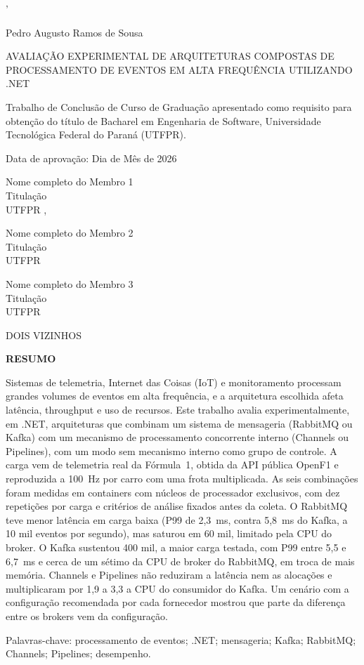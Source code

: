 '\documentclass[12pt]{article}
\newcommand{\autor}{Pedro Augusto Ramos de Sousa}
\newcommand{\titulo}{Avaliação Experimental de Arquiteturas Compostas de Processamento de Eventos em Alta Frequência Utilizando .NET}
\newcommand{\tituloUppercase}{\MakeUppercase{\titulo}}
\newcommand{\textoResumo}{Sistemas de telemetria, Internet das Coisas (IoT) e monitoramento processam grandes volumes de eventos em alta frequência, e a arquitetura escolhida afeta latência, throughput e uso de recursos. Este trabalho avalia experimentalmente, em .NET, arquiteturas que combinam um sistema de mensageria (RabbitMQ ou Kafka) com um mecanismo de processamento concorrente interno (Channels ou Pipelines), com um modo sem mecanismo interno como grupo de controle. A carga vem de telemetria real da Fórmula~1, obtida da API pública OpenF1 e reproduzida a 100~Hz por carro com uma frota multiplicada. As seis combinações foram medidas em containers com núcleos de processador exclusivos, com dez repetições por carga e critérios de análise fixados antes da coleta. O RabbitMQ teve menor latência em carga baixa (P99 de 2,3~ms, contra 5,8~ms do Kafka, a 10 mil eventos por segundo), mas saturou em 60 mil, limitado pela CPU do broker. O Kafka sustentou 400 mil, a maior carga testada, com P99 entre 5,5 e 6,7~ms e cerca de um sétimo da CPU de broker do RabbitMQ, em troca de mais memória. Channels e Pipelines não reduziram a latência nem as alocações e multiplicaram por 1,9 a 3,3 a CPU do consumidor do Kafka. Um cenário com a configuração recomendada por cada fornecedor mostrou que parte da diferença entre os brokers vem da configuração.}
\newcommand{\datadeaprovacao}{Dia de Mês de 2026}
\newcommand{\ano}{\the\year{}}
\newcommand{\membroUm}{Nome completo do Membro 1}
\newcommand{\titulacaoMembroUm}{Titulação}
\newcommand{\instituicaoMembroUm}{UTFPR}
\newcommand{\membroDois}{Nome completo do Membro 2}
\newcommand{\titulacaoMembroDois}{Titulação}
\newcommand{\instituicaoMembroDois}{UTFPR}
\newcommand{\membroTres}{Nome completo do Membro 3}
\newcommand{\titulacaoMembroTres}{Titulação}
\newcommand{\instituicaoMembroTres}{UTFPR}
\begin{document}
\begin{titlepage}
\centering
{\large \autor \par}
\vspace{1.5cm}
{\large \tituloUppercase \par}
\vspace{2cm}
\hfill
\parbox[t]{8cm}{
Trabalho de Conclusão de Curso de Graduação apresentado como requisito para obtenção do
título de Bacharel em Engenharia de Software, Universidade Tecnológica Federal do Paraná
(UTFPR). \par
}

\vspace{1.5cm}
{Data de aprovação: \datadeaprovacao \par}
\vspace{1.5cm}
\hrulefill
\vspace{-0.3cm}

{\membroUm}\\
{\titulacaoMembroUm}\\
{\instituicaoMembroUm}
\vspace{1cm},

\hrulefill
\vspace{-0.3cm}

{\membroDois}\\
{\titulacaoMembroDois}\\
{\instituicaoMembroDois}\\
\vspace{1cm}

\hrulefill
\vspace{-0.3cm}

{\membroTres}\\
{\titulacaoMembroTres}\\
{\instituicaoMembroTres}\\

\vspace*{\fill}
{\large DOIS VIZINHOS \par}
{\large \ano \par}
\end{titlepage}

\newpage
\pagestyle{empty}

\centering
{\textbf{RESUMO} \par}
\vspace{1cm}
\justifying
\noindent
\textoResumo

\noindent
Palavras-chave: processamento de eventos; .NET; mensageria; Kafka; RabbitMQ; Channels; Pipelines; desempenho.
\vspace{1cm}
\end{document}
